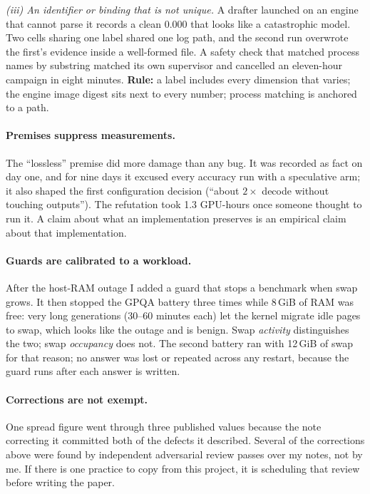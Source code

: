 \emph{(iii) An identifier or binding that is not unique.} A drafter launched on an engine that cannot
parse it records a clean 0.000 that looks like a catastrophic model. Two cells sharing one label shared
one log path, and the second run overwrote the first's evidence inside a well-formed file. A safety
check that matched process names by substring matched its own supervisor and cancelled an eleven-hour
campaign in eight minutes. \textbf{Rule:} a label includes every dimension that varies; the engine
image digest sits next to every number; process matching is anchored to a path.

\paragraph{Premises suppress measurements.} The ``lossless'' premise did more damage than any bug. It
was recorded as fact on day one, and for nine days it excused every accuracy run with a speculative
arm; it also shaped the first configuration decision (``about $2\times$ decode without touching
outputs''). The refutation took 1.3 GPU-hours once someone thought to run it. A claim about what an
implementation preserves is an empirical claim about that implementation.

\paragraph{Guards are calibrated to a workload.} After the host-RAM outage I added a guard that stops
a benchmark when swap grows. It then stopped the GPQA battery three times while 8\,GiB of RAM was
free: very long generations (30--60 minutes each) let the kernel migrate idle pages to swap, which
looks like the outage and is benign. Swap \emph{activity} distinguishes the two; swap
\emph{occupancy} does not. The second battery ran with 12\,GiB of swap for that reason; no answer was
lost or repeated across any restart, because the guard runs after each answer is written.

\paragraph{Corrections are not exempt.} One spread figure went through three published values because
the note correcting it committed both of the defects it described. Several of the corrections above
were found by independent adversarial review passes over my notes, not by me. If there is one
practice to copy from this project, it is scheduling that review before writing the paper.
